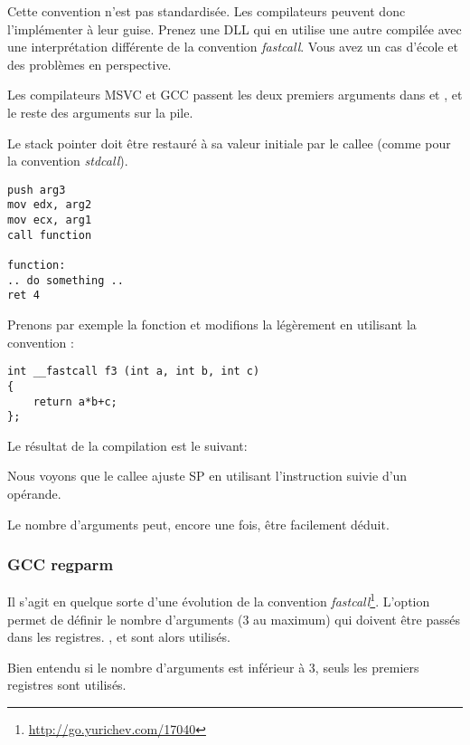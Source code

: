 Cette convention n'est pas standardisée. Les compilateurs peuvent donc l'implémenter à leur guise.
Prenez une DLL qui en utilise une autre compilée avec une interprétation différente de la convention 
\emph{fastcall}. Vous avez un cas d'école et des problèmes en perspective.

Les compilateurs MSVC et GCC passent les deux premiers arguments dans \ECX et \EDX, et le reste des
arguments sur la pile.

Le \gls{stack pointer} doit être restauré à sa valeur initiale par le \gls{callee} 
(comme pour la convention \emph{stdcall}).

\begin{lstlisting}[caption=fastcall,style=customasmx86]
push arg3
mov edx, arg2
mov ecx, arg1
call function

function:
.. do something ..
ret 4
\end{lstlisting}

Prenons par exemple la fonction  et modifions la légèrement en utilisant la convention  :

\begin{lstlisting}[style=customc]
int __fastcall f3 (int a, int b, int c)
{
	return a*b+c;
};
\end{lstlisting}

Le résultat de la compilation est le suivant:



Nous voyons que le \gls{callee} ajuste \ac{SP} en utilisant l'instruction  suivie d'un opérande.

Le nombre d'arguments peut, encore une fois, être facilement déduit.

\subsubsection{GCC regparm}

\newcommand{\URLREGPARMM}{\url{http://go.yurichev.com/17040}}

Il s'agit en quelque sorte d'une évolution de la convention \emph{fastcall}\footnote{\URLREGPARMM}.
L'option  permet de définir le nombre d'arguments (3 au maximum) qui doivent être passés 
dans les registres. \EAX, \EDX et \ECX sont alors utilisés.

Bien entendu si le nombre d'arguments est inférieur à 3, seuls les premiers registres sont utilisés.

